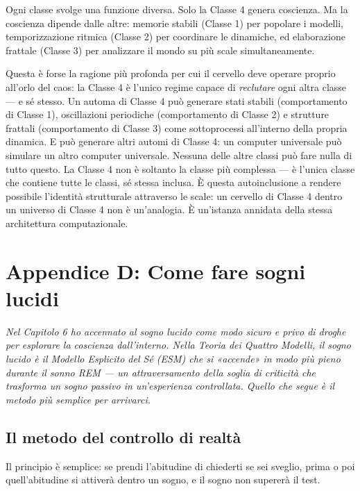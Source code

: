 \documentclass[11pt, twoside, openright]{book}
\begin{document}
Ogni classe svolge una funzione diversa. Solo la Classe 4 genera coscienza. Ma la coscienza dipende dalle altre: memorie stabili (Classe 1) per popolare i modelli, temporizzazione ritmica (Classe 2) per coordinare le dinamiche, ed elaborazione frattale (Classe 3) per analizzare il mondo su più scale simultaneamente.

Questa è forse la ragione più profonda per cui il cervello deve operare proprio all'orlo del caos: la Classe 4 è l'unico regime capace di \textit{reclutare} ogni altra classe --- e sé stesso. Un automa di Classe 4 può generare stati stabili (comportamento di Classe 1), oscillazioni periodiche (comportamento di Classe 2) e strutture frattali (comportamento di Classe 3) come sottoprocessi all'interno della propria dinamica. E può generare altri automi di Classe 4: un computer universale può simulare un altro computer universale. Nessuna delle altre classi può fare nulla di tutto questo. La Classe 4 non è soltanto la classe più complessa --- è l'unica classe che contiene tutte le classi, sé stessa inclusa. È questa autoinclusione a rendere possibile l'identità strutturale attraverso le scale: un cervello di Classe 4 dentro un universo di Classe 4 non è un'analogia. È un'istanza annidata della stessa architettura computazionale.


\chapter*{Appendice D: Come fare sogni lucidi}

\textit{Nel Capitolo 6 ho accennato al sogno lucido come modo sicuro e privo di droghe per esplorare la coscienza dall'interno. Nella Teoria dei Quattro Modelli, il sogno lucido è il Modello Esplicito del Sé (ESM) che si «accende» in modo più pieno durante il sonno REM --- un attraversamento della soglia di criticità che trasforma un sogno passivo in un'esperienza controllata. Quello che segue è il metodo più semplice per arrivarci.}

\section*{Il metodo del controllo di realtà}

Il principio è semplice: se prendi l'abitudine di chiederti se sei sveglio, prima o poi quell'abitudine si attiverà dentro un sogno, e il sogno non supererà il test.
\end{document}
